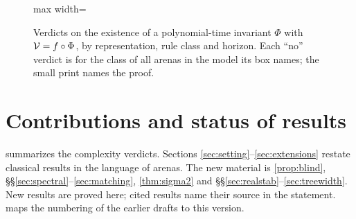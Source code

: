 \begin{figure}[t]
\begin{adjustbox}{max width=\linewidth}
\end{adjustbox}
\caption{Verdicts on the existence of a polynomial-time invariant $\Phi$ with $\mathcal{V}=f\circ\Phi$, by representation, rule class and horizon. Each ``no'' verdict is for the class of all arenas in the model its box names; the small print names the proof.}
\label{fig:glance}
\end{figure}

\section*{Contributions and status of results}

 summarizes the complexity verdicts. Sections \ref{sec:setting}--\ref{sec:extensions} restate classical results in the language of arenas. The new material is \cref{prop:blind}, \S\S\ref{sec:spectral}--\ref{sec:matching}, \cref{thm:sigma2} and \S\S\ref{sec:realstab}--\ref{sec:treewidth}. New results are proved here; cited results name their source in the statement.  maps the numbering of the earlier drafts to this version.


